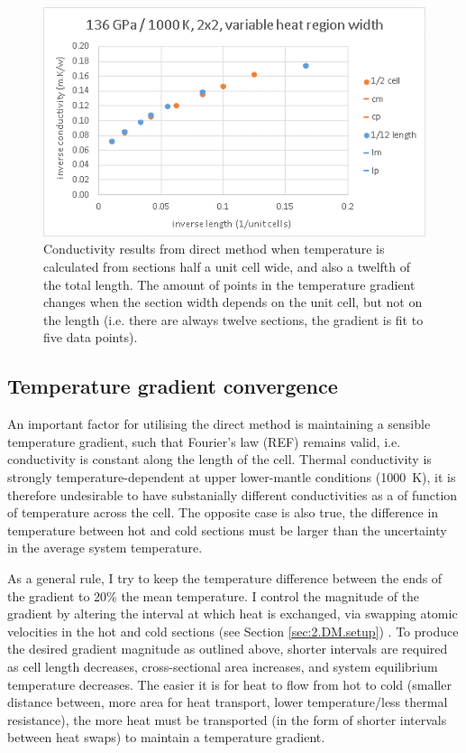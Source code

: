 \begin{figure}[h!]
\includegraphics[width=\linewidth]{Figures/direct_bin_width.png}
\caption[direct bin width]{Conductivity results from direct method when temperature is calculated from sections half a unit cell wide, and also a twelfth of the total length. The amount of points in the temperature gradient changes when the section width depends on the unit cell, but not on the length (i.e. there are always twelve sections, the gradient is fit to five data points).}
\label{fig:direct_bin_width}
\end{figure}

\pagebreak

\subsection{\label{sec:3.DM.grad}Temperature gradient convergence}

An important factor for utilising the direct method is maintaining a sensible temperature gradient, such that Fourier's law (REF) remains valid, i.e. conductivity is constant along the length of the cell. Thermal conductivity is strongly temperature-dependent at upper lower-mantle conditions (1000~K), it is therefore undesirable to have substanially different conductivities as a of function of temperature across the cell. The opposite case is also true, the difference in temperature between hot and cold sections must be larger than the uncertainty in the average system temperature. 

As a general rule, I try to keep the temperature difference between the ends of the gradient to 20\% the mean temperature. I control the magnitude of the gradient by altering the interval at which heat is exchanged, via swapping atomic velocities in the hot and cold sections (see Section \ref{sec:2.DM.setup}) . To produce the desired gradient magnitude as outlined above, shorter intervals are required as cell length decreases, cross-sectional area increases, and system equilibrium temperature decreases. The easier it is for heat to flow from hot to cold (smaller distance between, more area for heat transport, lower temperature/less thermal resistance), the more heat must be transported (in the form of shorter intervals between heat swaps) to maintain a temperature gradient.


